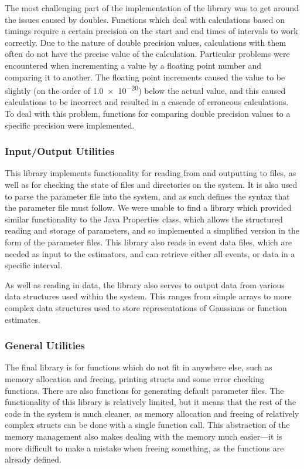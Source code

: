 \documentclass[a4paper,11pt]{article}
\begin{document}
    The most challenging part of the implementation of the library was to get
    around the issues caused by doubles. Functions which deal with calculations
    based on timings require a certain precision on the start and end times of
    intervals to work correctly. Due to the nature of double precision values,
    calculations with them often do not have the precise value of the
    calculation. Particular problems were encountered when incrementing a value
    by a floating point number and comparing it to another. The floating point
    increments caused the value to be slightly (on the order of \num{1.0e-20})
    below the actual value, and this caused calculations to be incorrect and
    resulted in a cascade of erroneous calculations. To deal with this problem,
    functions for comparing double precision values to a specific precision were
    implemented.
\subsubsection{Input/Output Utilities}
\label{sec-3-4-3}

    This library implements functionality for reading from and outputting to
    files, as well as for checking the state of files and directories on the
    system. It is also used to parse the parameter file into the system, and as
    such defines the syntax that the parameter file must follow. We were unable
    to find a library which provided similar functionality to the Java
    Properties class, which allows the structured reading and storage of
    parameters, and so implemented a simplified version in the form of the
    parameter files. This library also reads in event data files, which are
    needed as input to the estimators, and can retrieve either all events, or
    data in a specific interval.

    As well as reading in data, the library also serves to output data from
    various data structures used within the system. This ranges from simple
    arrays to more complex data structures used to store representations of
    Gaussians or function estimates.
\subsubsection{General Utilities}
\label{sec-3-4-4}

    The final library is for functions which do not fit in anywhere else, such
    as memory allocation and freeing, printing structs and some error checking
    functions. There are also functions for generating default parameter
    files. The functionality of this library is relatively limited, but it means
    that the rest of the code in the system is much cleaner, as memory
    allocation and freeing of relatively complex structs can be done with a
    single function call. This abstraction of the memory management also makes
    dealing with the memory much easier---it is more difficult to make a mistake
    when freeing something, as the functions are already defined.
\end{document}
